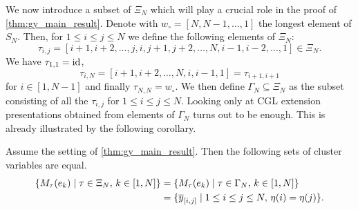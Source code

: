 We now introduce a subset of $\Xi_N$ which will play a crucial role in the proof of
\cref{thm:gy_main_result}. Denote with $w_\circ = [N, N-1, \dots, 1]$ the longest
element of $S_N$. Then, for $1 \leq i \leq j \leq N$ we define the following elements
of $\Xi_N$:
\begin{equation*}
	\tau_{i,j} = [i+1, i+2, \dots, j, i ,j+1, j+2, \dots, N, i-1,i-2, \dots, 1] \in \Xi_N.
\end{equation*}
%
We have $\tau_{1,1} = \operatorname{id}$,
\begin{equation*}
	\tau_{i, N} = [i+1, i+2, \dots, N, i, i-1, 1] = \tau_{i+1, i+1}
\end{equation*}
%
for $i \in [1, N-1]$ and finally $\tau_{N, N} = w_\circ$. We then define $\Gamma_N
	\subseteq \Xi_N$ as the subset consisting of all the $\tau_{i,j}$ for $1 \leq i \leq j
	\leq N$. Looking only at CGL extension presentations obtained from elements of
$\Gamma_N$ turns out to be enough. This is already illustrated by the following
corollary.
\begin{corollary}
	Assume the setting of \cref{thm:gy_main_result}. Then the following sets of cluster variables are equal.
	\begin{align*}
		\{M_\tau(e_k) \mid \tau \in \Xi_N,\, k \in [1, N]\}
		 & = \{M_\tau(e_k) \mid \tau \in \Gamma_N,\, k \in [1, N]\}             \\
		 & = \{\overline{y}_{[i,j]} \mid 1 \leq i \leq j \leq N, \, \eta(i) = \eta(j)\}.
	\end{align*}
\end{corollary}
